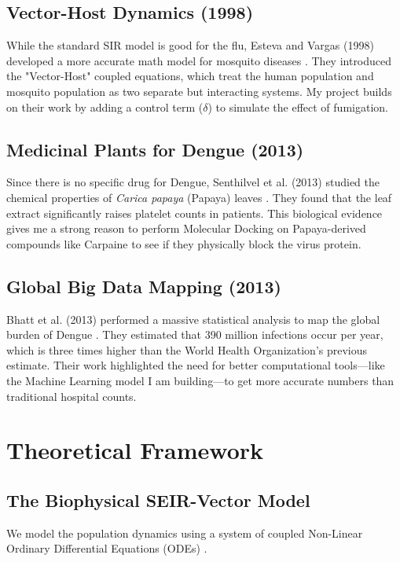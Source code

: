 \documentclass[12pt, a4paper]{article}
\begin{document}
\subsection{Vector-Host Dynamics (1998)}
While the standard SIR model is good for the flu, Esteva and Vargas (1998) developed a more accurate math model for mosquito diseases \cite{ref10}. They introduced the "Vector-Host" coupled equations, which treat the human population and mosquito population as two separate but interacting systems. My project builds on their work by adding a control term ($\delta$) to simulate the effect of fumigation.

\subsection{Medicinal Plants for Dengue (2013)}
Since there is no specific drug for Dengue, Senthilvel et al. (2013) studied the chemical properties of \textit{Carica papaya} (Papaya) leaves \cite{ref11}. They found that the leaf extract significantly raises platelet counts in patients. This biological evidence gives me a strong reason to perform Molecular Docking on Papaya-derived compounds like Carpaine to see if they physically block the virus protein.

\subsection{Global Big Data Mapping (2013)}
Bhatt et al. (2013) performed a massive statistical analysis to map the global burden of Dengue \cite{ref12}. They estimated that 390 million infections occur per year, which is three times higher than the World Health Organization's previous estimate. Their work highlighted the need for better computational tools—like the Machine Learning model I am building—to get more accurate numbers than traditional hospital counts.

\newpage

\section{Theoretical Framework}

\subsection{The Biophysical SEIR-Vector Model}
We model the population dynamics using a system of coupled Non-Linear Ordinary Differential Equations (ODEs) \cite{ref10}.
\end{document}
